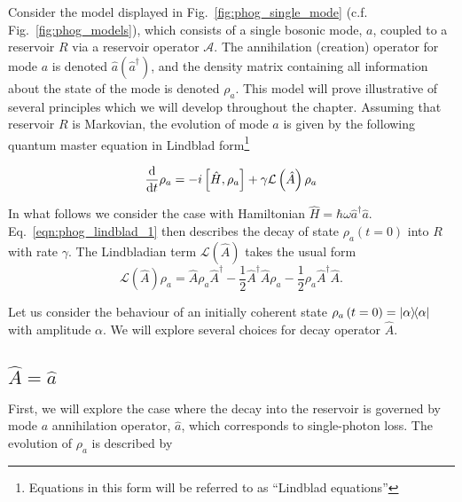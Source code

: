 
Consider the model displayed in Fig.~\ref{fig:phog_single_mode} (c.f. Fig.~\ref{fig:phog_models}\MakeUppercase{}), which consists of a single bosonic mode, $a$, coupled to a reservoir $R$ via a reservoir operator $\mathcal{A}$. The annihilation (creation) operator for mode $a$ is denoted $\hat{a} \left(\hat{a}^\dagger\right)$, and the density matrix containing all information about the state of the mode is denoted $\rho_a$. This model will prove illustrative of several principles which we will develop throughout the chapter. Assuming that reservoir $R$ is Markovian, the evolution of mode $a$ is given by the following quantum master equation in Lindblad form\footnote{Equations in this form will be referred to as ``Lindblad equations''}

\begin{equation}\label{eqn:phog_lindblad_1}
\frac{\mathrm{d}}{\mathrm{d}t} \rho_a =  - i \left[\hat{H}, \rho_a\right] + \gamma \mathcal{L}\left(\hat{A}\right)\rho_a
\end{equation}

\noindent In what follows we consider the case with Hamiltonian $\hat{H} = \hbar \omega \hat{a}^\dagger \hat{a}$. Eq.~\ref{eqn:phog_lindblad_1} then describes the decay of state $\rho_a\left(t=0\right)$ into $R$ with rate $\gamma$. The Lindbladian term $\mathcal{L}\left(\hat{A}\right)$ takes the usual form
\begin{equation}\label{eqn:phog_lindbladian_form}
\mathcal{L}\left(\hat{A}\right)\rho_a = \hat{A}\rho_a\hat{A}^\dagger - \frac{1}{2} \hat{A}^\dagger \hat{A} \rho_a - \frac{1}{2} \rho_a \hat{A}^\dagger \hat{A}.
\end{equation}

\noindent Let us consider the behaviour of an initially coherent state $\rho_a\left(t=0\right) = \dyad{\alpha}$ with amplitude $\alpha$. We will explore several choices for decay operator $\hat{A}$.

\subsection{$\hat{A} = \hat{a}$}
First, we will explore the case where the decay into the reservoir is governed by mode $a$ annihilation operator, $\hat{a}$, which corresponds to single-photon loss.%
The evolution of $\rho_a$ is described by

